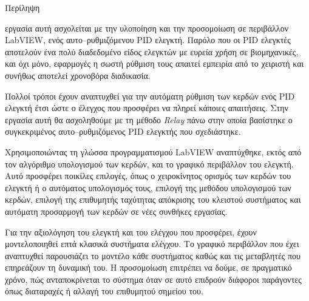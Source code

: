 \pagestyle{plain}
\begin{center}
{\LARGE Περίληψη}\\[1cm]
\end{center}


\lettrine[findent=2pt]{}{ } εργασία αυτή ασχολείται με την υλοποίηση και την προσομοίωση σε περιβάλλον LabVIEW, ενός αυτο--ρυθμιζόμενου PID ελεγκτή. Παρόλο που οι PID ελεγκτές αποτελούν ένα πολύ διαδεδομένο είδος ελεγκτών με ευρεία χρήση σε βιομηχανικές, και όχι μόνο, εφαρμογές η σωστή ρύθμιση τους απαιτεί εμπειρία από το χειριστή και συνήθως αποτελεί χρονοβόρα διαδικασία.

Πολλοί τρόποι έχουν αναπτυχθεί για την αυτόματη ρύθμιση των κερδών ενός PID ελεγκτή έτσι ώστε ο έλεγχος που προσφέρει να πληρεί κάποιες απαιτήσεις. Στην εργασία αυτή θα ασχοληθούμε με τη μέθοδο \emph{Relay} πάνω στην οποία βασίστηκε ο συγκεκριμένος αυτο--ρυθμιζόμενος PID ελεγκτής που σχεδιάστηκε. 

Χρησιμοποιώντας τη γλώσσα προγραμματισμού LabVIEW αναπτύχθηκε, εκτός από τον αλγόριθμο υπολογισμού των κερδών, και το γραφικό περιβάλλον του ελεγκτή. Αυτό προσφέρει ποικίλες επιλογές, όπως ο χειροκίνητος ορισμός των κερδών του ελεγκτή ή ο αυτόματος υπολογισμός τους, επιλογή της μεθόδου υπολογισμού των κερδών, επιλογή της επιθυμητής ταχύτητας απόκρισης του κλειστού συστήματος και αυτόματη προσαρμογή των κερδών σε νέες συνθήκες εργασίας.

Για την αξιολόγηση του ελεγκτή και του ελέγχου που προσφέρει, έχουν μοντελοποιηθεί επτά κλασικά συστήματα ελέγχου. Το γραφικό περιβάλλον που έχει αναπτυχθεί παρουσιάζει το μοντέλο κάθε συστήματος καθώς και τις μεταβλητές που επηρεάζουν τη δυναμική του. Η προσομοίωση επιτρέπει να δούμε, σε πραγματικό χρόνο, πώς ανταποκρίνεται το σύστημα όταν σε αυτό επιδρούν διάφοροι παράγοντες όπως διαταραχές ή αλλαγή του επιθυμητού σημείου του.
